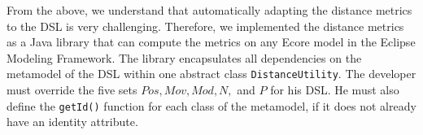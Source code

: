 From the above, we understand that automatically adapting the distance metrics to the DSL is very challenging.
Therefore, we implemented the distance metrics as a Java library that can compute the metrics on any Ecore model in the Eclipse Modeling Framework.
The library encapsulates all dependencies on the metamodel of the DSL within one abstract class \texttt{DistanceUtility}.
The developer must override the five sets $Pos,Mov,Mod,N,$ and $P$ for his DSL.
He must also define the \texttt{getId()} function for each class of the metamodel, if it does not already have an identity attribute.



%
%
%
%
%
%
%
%
%
